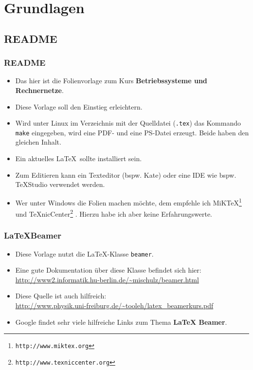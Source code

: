 
\section{Grundlagen}

\subsection{README}


\begin{frame}[fragile]
	\frametitle{README}
	\begin{itemize}
		\item Das hier ist die Folienvorlage zum Kurs \textbf{Betriebssysteme und Rechnernetze}.
		\item Diese Vorlage soll den Einstieg erleichtern.
		\item Wird unter Linux im Verzeichnis mit der Quelldatei (\texttt{.tex}) das Kommando \texttt{make} eingegeben, wird eine PDF- und eine PS-Datei erzeugt. Beide haben den gleichen Inhalt.
		\item Ein aktuelles \LaTeX\ sollte installiert sein.
		\item Zum Editieren kann ein Texteditor (bspw. Kate) oder eine IDE wie bspw. TeXStudio \cite{TeXStudio} verwendet werden.
		\item Wer unter Windows die Folien machen möchte, dem empfehle ich MiK\TeX\footnote{\texttt{http://www.miktex.org}} \cite{MikTeX} und \TeX nicCenter\footnote{\texttt{http://www.texniccenter.org}} \cite{TexNic}. Hierzu habe ich aber keine Erfahrungswerte.
	\end{itemize}
\end{frame}

\begin{frame}[fragile]
	\frametitle{\LaTeX Beamer}
	\begin{itemize}
		\item Diese Vorlage nutzt die \LaTeX-Klasse \texttt{beamer}.
		\item Eine gute Dokumentation über diese Klasse befindet sich hier:\\
		\url{http://www2.informatik.hu-berlin.de/~mischulz/beamer.html}
		\item Diese Quelle ist auch hilfreich:\\
		\url{http://www.physik.uni-freiburg.de/~tooleh/latex_beamerkurs.pdf}
		\item Google findet sehr viele hilfreiche Links zum Thema \textbf{LaTeX Beamer}.
	\end{itemize}
\end{frame}


